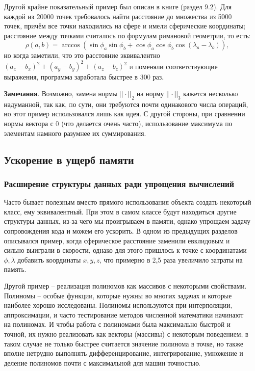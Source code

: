 \documentclass[a4paper, 12pt]{article}
\begin{document}
Другой крайне показательный пример был описан в книге \cite{zem} (раздел 9.2). Для каждой из 20000 точек требовалось найти расстояние до множества из 5000 точек, причём все точки находились на сфере и имели сферические координаты; расстояние между точками считалось по формулам римановой геометрии, то есть:
$$\rho (a, b) =\arccos \left(\sin \phi_a \sin \phi_b + \cos \phi_a \cos \phi_b \cos (\lambda_a -\lambda_b) \right),$$
но когда заметили, что это расстояние эквивалентно $(a_x-b_x)^2+(a_y-b_y)^2+(a_z-b_z)^2$ и поменяли соответствующие выражения, программа заработала быстрее в 300 раз.

{\bf Замечания}. Возможно, замена нормы $||\cdot||_2$ на норму $||\cdot||_3$ кажется несколько надуманной, так как, по сути, они требуются почти одинакового числа операций, но этот пример использовался лишь как идея. С другой стороны, при сравнении нормы вектора с 0 (что делается очень часто), использование максимума по элементам намного разумнее их суммирования.

\subsection{Ускорение в ущерб памяти}

\subsubsection{Расширение структуры данных ради упрощения вычислений}
Часто бывает полезным вместо прямого использования объекта создать некоторый класс, ему эквивалентный.
При этом в самом классе будут находиться другие структуры данных, из-за чего мы проигрываем в памяти, однако упрощаем задачу сопровождения кода и можем его ускорить.
В одном из предыдущих разделов описывался пример, когда сферическое расстояние заменили евклидовым и сильно выиграли в скорости, однако для этого пришлось к точке с координатами $\phi, \lambda$ добавить координаты $x,y,z$, что примерно в 2,5 раза увеличило затраты на память.

Другой пример -- реализация полиномов как массивов с некоторыми свойствами. Полиномы -- особые функции, которые нужны во многих задачах и которые наиболее хорошо исследованы. Полиномы используются при интерполяции, аппроксимации, и часто тестирование методов численной математики начинают на полиномах.
И чтобы работа с полиномами была максимально быстрой и точной, их нужно реализовать как векторы (массивы) с некоторым поведением; в таком случае не только быстрее считается значение полинома в точке, но также вполне нетрудно выполнять дифференцирование, интегрирование, умножение и деление полиномов почти с максимальной для машин точностью. 
\end{document}
